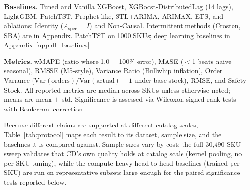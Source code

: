 \documentclass[10pt]{article} %
\theoremstyle{plain}
\theoremstyle{definition}
\newcommand{\Aspec}{A_{\text{spec}}}
\begin{document}
\textbf{Baselines.} Tuned and Vanilla XGBoost, XGBoost-DistributedLag (14 lags), LightGBM, PatchTST, Prophet-like, STL+ARIMA, ARIMAX, ETS, and ablations: Identity ($\Aspec = I$) and Non-Causal. Intermittent methods (Croston, SBA) are in Appendix. PatchTST on 1000 SKUs; deep learning baselines in Appendix~\ref{app:dl_baselines}.

\textbf{Metrics.} wMAPE (ratio where 1.0 = 100\% error), MASE ($<$1 beats naive seasonal), RMSSE (M5-style), Variance Ratio (Bullwhip inflation), Order Variance ($\mathrm{Var}(\mathrm{orders})/\mathrm{Var}(\mathrm{actual}) - 1$ under base-stock), RMSE, and Safety Stock. All reported metrics are median across SKUs unless otherwise noted; means are mean $\pm$ std. Significance is assessed via Wilcoxon signed-rank tests with Bonferroni correction.

Because different claims are supported at different catalog scales, Table~\ref{tab:protocol} maps each result to its dataset, sample size, and the baselines it is compared against. Sample sizes vary by cost: the full 30,490-SKU sweep validates that CD's own quality holds at catalog scale (kernel pooling, no per-SKU tuning), while the compute-heavy head-to-head baselines (trained per SKU) are run on representative subsets large enough for the paired significance tests reported below.

\begin{table}[t]
\centering
\footnotesize
\setlength{\tabcolsep}{4pt}
\caption{Evaluation protocol: which claim is supported by which dataset, sample size, and baselines. ``AR-only'' marks autoregressive baselines that do \emph{not} receive the future calendar (see Information parity, and the Finding 4a caveat).}
\label{tab:protocol}
\end{table}
\end{document}
